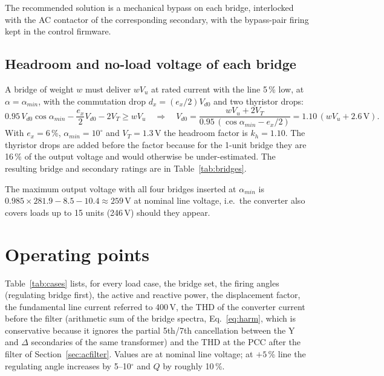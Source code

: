 \documentclass[11pt,a4paper]{article}
\newcommand{\Vdo}{V_{d0}}
\newcommand{\Id}{I_d}
\newcommand{\ex}{e_x}
\newcommand{\dx}{d_x}
\newcommand{\Ell}{E_{2}}
\begin{document}
The recommended solution is a mechanical bypass on each bridge, interlocked with the AC contactor of the corresponding secondary, with the bypass-pair firing kept in the control firmware.

\subsection{Headroom and no-load voltage of each bridge}
\label{sec:headroom}

A bridge of weight $w$ must deliver $wV_u$ at rated current with the line 5\,\% low, at $\alpha = \alpha_{min}$, with the commutation drop $\dx = (\ex/2)\Vdo$ and two thyristor drops:
\begin{equation}
0.95\,\Vdo\cos\alpha_{min} - \frac{\ex}{2}\Vdo - 2V_T \ge wV_u
\quad\Rightarrow\quad
\Vdo = \frac{wV_u + 2V_T}{0.95\,(\cos\alpha_{min} - \ex/2)} = 1.10\,(wV_u + 2.6\,\text{V}).
\label{eq:vd0i}
\end{equation}
With $\ex = 6$\,\%, $\alpha_{min} = 10^\circ$ and $V_T = 1.3$\,V the headroom factor is $k_h = 1.10$. The thyristor drops are added before the factor because for the 1-unit bridge they are 16\,\% of the output voltage and would otherwise be under-estimated. The resulting bridge and secondary ratings are in Table~\ref{tab:bridges}.

\begin{table}[h]
\centering

\caption{Bridge no-load voltages and secondary ratings ($\Id{}_{,r} = 1100$\,A, $I_2 = 0.816\,\Id$, $S_2 = \sqrt3\Ell I_2 = 1.047\,\Vdo\Id$). Total 325\,kVA.}
\label{tab:bridges}
\end{table}

The maximum output voltage with all four bridges inserted at $\alpha_{min}$ is $0.985\times281.9 - 8.5 - 10.4 \approx 259$\,V at nominal line voltage, i.e.\ the converter also covers loads up to 15 units (246\,V) should they appear.

\section{Operating points}
\label{sec:cases}

Table~\ref{tab:cases} lists, for every load case, the bridge set, the firing angles (regulating bridge first), the active and reactive power, the displacement factor, the fundamental line current referred to 400\,V, the THD of the converter current before the filter (arithmetic sum of the bridge spectra, Eq.~\eqref{eq:harm}, which is conservative because it ignores the partial 5th/7th cancellation between the Y and $\Delta$ secondaries of the same transformer) and the THD at the PCC after the filter of Section~\ref{sec:acfilter}. Values are at nominal line voltage; at $+5$\,\% line the regulating angle increases by 5--10$^\circ$ and $Q$ by roughly 10\,\%.
\end{document}
